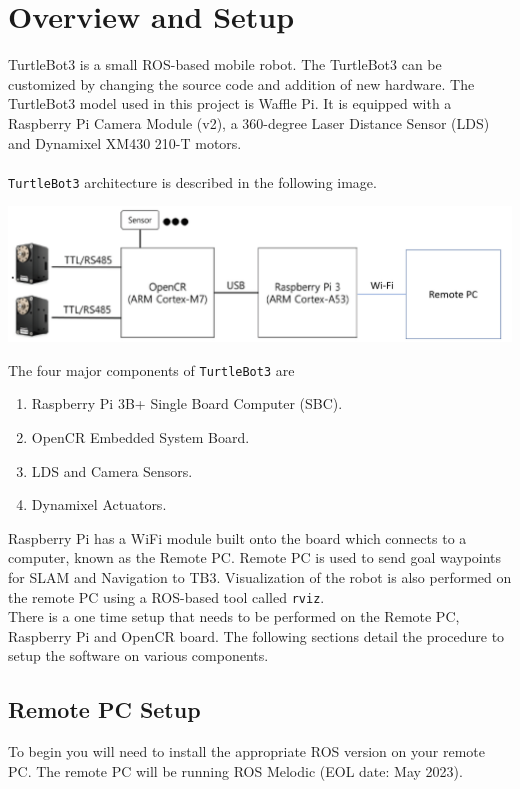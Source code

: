 \documentclass[12]{article}
\begin{document}
\section{Overview and Setup}
TurtleBot3 is a small ROS-based mobile robot. The TurtleBot3 can be customized by changing the source code and addition of new hardware. The TurtleBot3 model used in this project is Waffle Pi. It is equipped with a Raspberry Pi Camera Module (v2), a 360-degree Laser Distance Sensor (LDS) and Dynamixel XM430 210-T motors.\\\\
\texttt{TurtleBot3} architecture is described in the following image.\\
\begin{center}
\includegraphics[width=0.7\linewidth]{images/tb3_architecture.png}\\
\end{center}
The four major components of \texttt{TurtleBot3} are 
\begin{enumerate}
	\item {Raspberry Pi 3B+ Single Board Computer (SBC).}
	\item {OpenCR Embedded System Board.}
	\item {LDS and Camera Sensors.}
	\item {Dynamixel Actuators.}
\end{enumerate}
Raspberry Pi has a WiFi module built onto the board which connects to a computer, known as the Remote PC. Remote PC is used to send goal waypoints for SLAM and Navigation to TB3. Visualization of the robot is also performed on the remote PC using a ROS-based tool called \texttt{rviz}.\\
There is a one time setup that needs to be performed on the Remote PC, Raspberry Pi and OpenCR board. The following sections detail the procedure to setup the software on various components.
\subsection{Remote PC Setup}
To begin you will need to install the appropriate ROS version on your remote PC. The remote PC will be running ROS Melodic (EOL date: May 2023).
\end{document}

